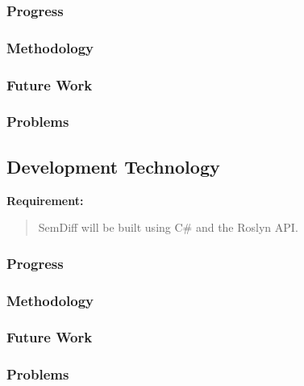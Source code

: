 \documentclass[draftclsnofoot,onecolumn]{IEEEtran}
\begin{document}
\subsubsection{Progress}

\subsubsection{Methodology}

\subsubsection{Future Work}

\subsubsection{Problems}






\subsection{Development Technology}

\textbf{Requirement:}

\begin{quote}

SemDiff will be built using C\# and the Roslyn API.

\end{quote}

\subsubsection{Progress}

\subsubsection{Methodology}

\subsubsection{Future Work}

\subsubsection{Problems}
\end{document}
